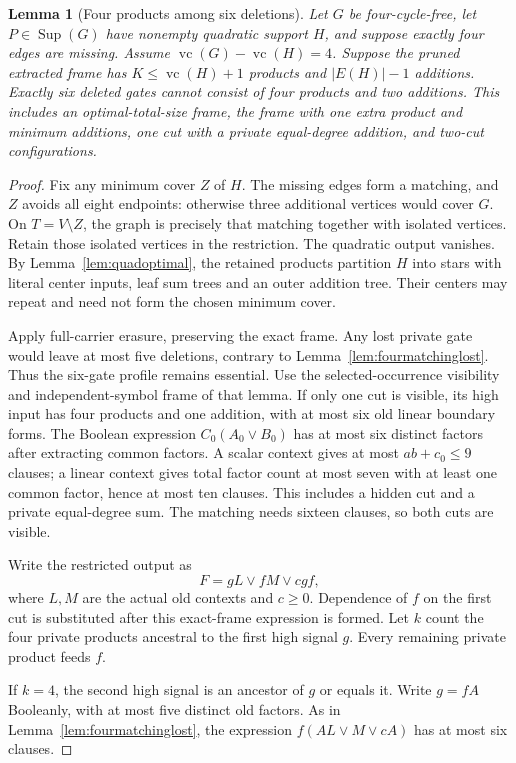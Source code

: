\documentclass[11pt]{article}
\newcommand{\Sup}{\operatorname{Sup}}
\newcommand{\vc}{\operatorname{vc}}
\newtheorem{lemma}[theorem]{Lemma}
\theoremstyle{definition}
\theoremstyle{remark}
\begin{document}
\begin{lemma}[Four products among six deletions]\label{lem:fourproductssix}
Let $G$ be four-cycle-free, let $P\in\Sup(G)$ have nonempty quadratic support $H$, and suppose exactly four edges are missing. Assume $\vc(G)-\vc(H)=4$. Suppose the pruned extracted frame has $K\le\vc(H)+1$ products and $|E(H)|-1$ additions. Exactly six deleted gates cannot consist of four products and two additions. This includes an optimal-total-size frame, the frame with one extra product and minimum additions, one cut with a private equal-degree addition, and two-cut configurations.
\end{lemma}
\begin{proof}
Fix any minimum cover $Z$ of $H$. The missing edges form a matching, and $Z$ avoids all eight endpoints: otherwise three additional vertices would cover $G$. On $T=V\setminus Z$, the graph is precisely that matching together with isolated vertices. Retain those isolated vertices in the restriction. The quadratic output vanishes. By Lemma~\ref{lem:quadoptimal}, the retained products partition $H$ into stars with literal center inputs, leaf sum trees and an outer addition tree. Their centers may repeat and need not form the chosen minimum cover.

Apply full-carrier erasure, preserving the exact frame. Any lost private gate would leave at most five deletions, contrary to Lemma~\ref{lem:fourmatchinglost}. Thus the six-gate profile remains essential. Use the selected-occurrence visibility and independent-symbol frame of that lemma. If only one cut is visible, its high input has four products and one addition, with at most six old linear boundary forms. The Boolean expression $C_0(A_0\vee B_0)$ has at most six distinct factors after extracting common factors. A scalar context gives at most $ab+c_0\le9$ clauses; a linear context gives total factor count at most seven with at least one common factor, hence at most ten clauses. This includes a hidden cut and a private equal-degree sum. The matching needs sixteen clauses, so both cuts are visible.

Write the restricted output as
\[
 F=gL\vee fM\vee cgf,
\]
where $L,M$ are the actual old contexts and $c\ge0$. Dependence of $f$ on the first cut is substituted after this exact-frame expression is formed. Let $k$ count the four private products ancestral to the first high signal $g$. Every remaining private product feeds $f$.

If $k=4$, the second high signal is an ancestor of $g$ or equals it. Write $g=fA$ Booleanly, with at most five distinct old factors. As in Lemma~\ref{lem:fourmatchinglost}, the expression $f(AL\vee M\vee cA)$ has at most six clauses.


\end{proof}
\end{document}
